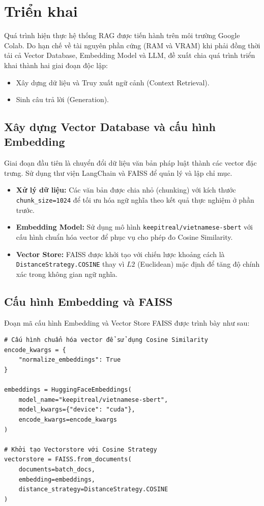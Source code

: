 \section{Triển khai}

Quá trình hiện thực hệ thống RAG được tiến hành trên môi trường Google Colab. Do hạn chế về tài nguyên phần cứng (RAM và VRAM) khi phải đồng thời tải cả Vector Database, Embedding Model và LLM, đề xuất chia quá trình triển khai thành hai giai đoạn độc lập: 
\begin{itemize}
    \item Xây dựng dữ liệu và Truy xuất ngữ cảnh (Context Retrieval).
    \item Sinh câu trả lời (Generation).
\end{itemize}

\subsection{Xây dựng Vector Database và cấu hình Embedding}

Giai đoạn đầu tiên là chuyển đổi dữ liệu văn bản pháp luật thành các vector đặc trưng. Sử dụng
thư viện LangChain và FAISS để quản lý và lập chỉ mục.
 
\begin{itemize}
    \item \textbf{Xử lý dữ liệu:} Các văn bản được chia nhỏ (chunking) với kích thước \texttt{chunk\_size=1024} để
    tối ưu hóa ngữ nghĩa theo kết quả thực nghiệm ở phần trước.
 
    \item \textbf{Embedding Model:} Sử dụng mô hình \texttt{keepitreal/vietnamese-sbert} với cấu hình chuẩn hóa
    vector để phục vụ cho phép đo Cosine Similarity.
 
    \item \textbf{Vector Store:} FAISS được khởi tạo với chiến lược khoảng cách là \texttt{DistanceStrategy.COSINE}
    thay vì $L2$ (Euclidean) mặc định để tăng độ chính xác trong không gian ngữ nghĩa.
\end{itemize}

\subsection{Cấu hình Embedding và FAISS}

Đoạn mã cấu hình Embedding và Vector Store FAISS được trình bày như sau:
 
\begin{verbatim}
# Cấu hình chuẩn hóa vector để sử dụng Cosine Similarity
encode_kwargs = {
    "normalize_embeddings": True
}
 
embeddings = HuggingFaceEmbeddings(
    model_name="keepitreal/vietnamese-sbert",
    model_kwargs={"device": "cuda"},
    encode_kwargs=encode_kwargs
)
 
# Khởi tạo Vectorstore với Cosine Strategy
vectorstore = FAISS.from_documents(
    documents=batch_docs,
    embedding=embeddings,
    distance_strategy=DistanceStrategy.COSINE
)
\end{verbatim}

